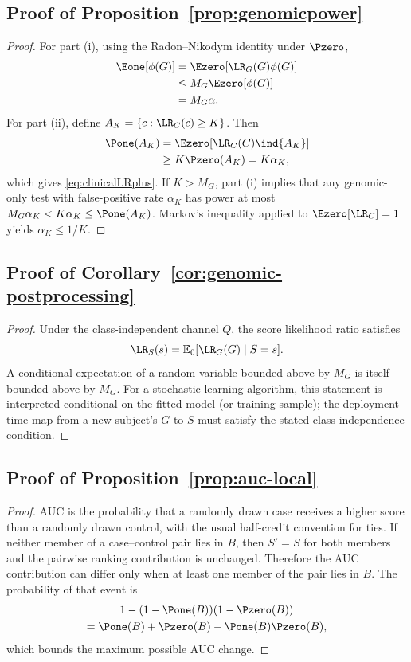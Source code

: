 \subsection{Proof of Proposition~\ref{prop:genomicpower}}
\begin{proof}
For part (i), using the Radon--Nikodym identity under $\Pzero$,
\begin{align}
\Eone[\phi(G)]
&=\Ezero[\LR_G(G)\phi(G)]\\
&\le M_G\Ezero[\phi(G)]\\
&=M_G\alpha.
\end{align}
For part (ii), define $A_K=\{c:\LR_C(c)\ge K\}$. Then
\begin{align}
\Pone(A_K)
&=\Ezero[\LR_C(C)\ind\{A_K\}]\\
&\ge K\Pzero(A_K)=K\alpha_K,
\end{align}
which gives \eqref{eq:clinicalLRplus}. If $K>M_G$, part (i) implies that any genomic-only test with false-positive rate $\alpha_K$ has power at most $M_G\alpha_K<K\alpha_K\le \Pone(A_K)$. Markov's inequality applied to $\Ezero[\LR_C]=1$ yields $\alpha_K\le 1/K$.
\end{proof}

\subsection{Proof of Corollary~\ref{cor:genomic-postprocessing}}
\begin{proof}
Under the class-independent channel $Q$, the score likelihood ratio satisfies
\begin{equation}
\LR_S(s)=\mathbb{E}_0[\LR_G(G)\mid S=s].
\end{equation}
A conditional expectation of a random variable bounded above by $M_G$ is itself bounded above by $M_G$. For a stochastic learning algorithm, this statement is interpreted conditional on the fitted model (or training sample); the deployment-time map from a new subject's $G$ to $S$ must satisfy the stated class-independence condition.
\end{proof}

\subsection{Proof of Proposition~\ref{prop:auc-local}}
\begin{proof}
AUC is the probability that a randomly drawn case receives a higher score than a randomly drawn control, with the usual half-credit convention for ties. If neither member of a case--control pair lies in $B$, then $S'=S$ for both members and the pairwise ranking contribution is unchanged. Therefore the AUC contribution can differ only when at least one member of the pair lies in $B$. The probability of that event is
\begin{multline}
1-(1-\Pone(B))(1-\Pzero(B))\\
=\Pone(B)+\Pzero(B)-\Pone(B)\Pzero(B),
\end{multline}
which bounds the maximum possible AUC change.
\end{proof}

